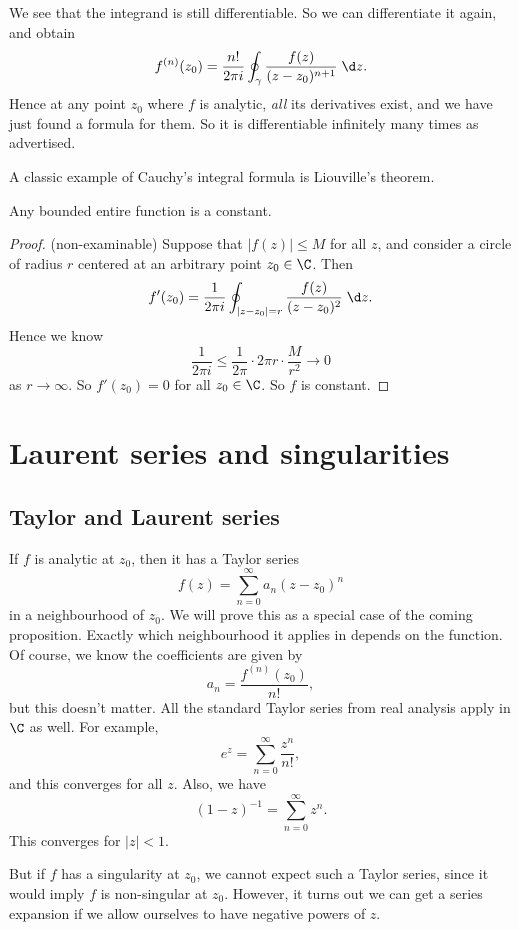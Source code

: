 \documentclass[a4paper]{article}
\begin{document}
We see that the integrand is still differentiable. So we can differentiate it again, and obtain
\[
  f^{(n)}(z_0) = \frac{n!}{2\pi i} \oint_{\gamma} \frac{f(z)}{(z - z_0)^{n + 1}}\;\d z.
\]
Hence at any point $z_0$ where $f$ is analytic, \emph{all} its derivatives exist, and we have just found a formula for them. So it is differentiable infinitely many times as advertised.

A classic example of Cauchy's integral formula is Liouville's theorem.
\begin{thm}
  Any bounded entire function is a constant.
\end{thm}

\begin{proof}(non-examinable)
  Suppose that $|f(z)| \leq M$ for all $z$, and consider a circle of radius $r$ centered at an arbitrary point $z_0 \in \C$. Then
  \[
    f'(z_0) = \frac{1}{2\pi i} \oint_{|z - z_0| = r} \frac{f(z)}{(z - z_0)^2}\;\d z.
  \]
  Hence we know
  \[
    \frac{1}{2\pi i} \leq \frac{1}{2\pi} \cdot 2\pi r \cdot \frac{M}{r^2} \to 0
  \]
  as $r \to \infty$. So $f'(z_0) = 0$ for all $z_0 \in \C$. So $f$ is constant.
\end{proof}

\section{Laurent series and singularities}
\subsection{Taylor and Laurent series}
If $f$ is analytic at $z_0$, then it has a Taylor series
\[
  f(z) = \sum_{n = 0}^\infty a_n (z - z_0)^n
\]
in a neighbourhood of $z_0$. We will prove this as a special case of the coming proposition. Exactly which neighbourhood it applies in depends on the function. Of course, we know the coefficients are given by
\[
  a_n = \frac{f^{(n)}(z_0)}{n!},
\]
but this doesn't matter. All the standard Taylor series from real analysis apply in $\C$ as well. For example,
\[
  e^z = \sum_{n = 0}^\infty \frac{z^n}{n!},
\]
and this converges for all $z$. Also, we have
\[
  (1 - z)^{-1} = \sum_{n = 0}^\infty z^n.
\]
This converges for $|z| < 1$.

But if $f$ has a singularity at $z_0$, we cannot expect such a Taylor series, since it would imply $f$ is non-singular at $z_0$. However, it turns out we can get a series expansion if we allow ourselves to have negative powers of $z$.
\end{document}
